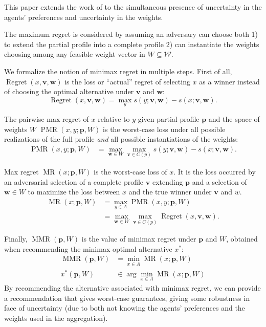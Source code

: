 \documentclass[12pt]{article}
\newcommand{\profile}{\textbf{v}}%
\newcommand{\pprofile}{\textbf{p}}%
\newcommand{\w}{\textbf{w}}%
\DeclareMathOperator{\Regret}{Regret}
\DeclareMathOperator{\PMR}{PMR}
\DeclareMathOperator{\MR}{MR}
\DeclareMathOperator{\MMR}{MMR}
\begin{document}
This paper extends the work of  to the simultaneous presence of uncertainty in the agents' preferences and uncertainty in the weights.

The maximum regret is considered by assuming an adversary can choose both 1) to extend the partial profile into a complete profile 2) can instantiate the weights choosing among any feasible weight vector in $W \subseteq \mathcal{W}$.

We formalize the notion of minimax regret in multiple steps.
First of all, $\Regret(x, \profile, \w)$ is the loss or ``actual'' regret  of selecting $x$ as a winner instead of choosing the optimal alternative under $\profile$ and $\w$:
\[\Regret(x, \profile, \w) = \max_{y} s(y; \profile,\w) - s(x; \profile, \w).\]

The pairwise max regret of $x$ relative to $y$ given partial profile $\pprofile$ and the space of weights $W$
$\PMR(x,y;\pprofile,W)$ is the worst-case loss under all possible realizations of the full profile {\em and} all possible instantiations of the weights:
\begin{align}
\PMR(x,y; \pprofile, W) & = \max_{\w \in W} \max_{\profile \in C(p)} s(y; \profile,\w) - s(x; \profile,\w).
\end{align}

Max regret $\MR(x;\pprofile,W)$ is the worst-case loss of $x$. It is the loss occurred by an adversarial selection of a complete profile $\profile$ extending $\pprofile$ and a selection of $\w \in W$ to maximize the loss between $x$ and the true winner under $\profile$ and $w$.
\begin{align}
\MR(x; \pprofile, W) & = \max_{y \in A} \PMR(x,y; \pprofile, W)\\
& = \max_{\w \in W} \max_{\profile \in C(p)} \Regret(x, \profile, \w).
\end{align}

Finally,  $\MMR(\pprofile,W)$ is the value of minimax regret under $\pprofile$ and $W$, obtained when recommending the minimax optimal alternative $x^*$:
\begin{align*}
\MMR(\pprofile,W) & = \min_{x \in A} \MR(x;\pprofile,W) \\
x^{*}(\pprofile,W) & \in \arg\min_{x \in A} \MR(x;\pprofile,W) 
\end{align*}
By recommending the alternative associated with minimax regret, we can provide a recommendation that gives worst-case guarantees, giving some robustness in face of uncertainty (due to both not knowing the agents' preferences and the weights used in the aggregation). 
\end{document}
